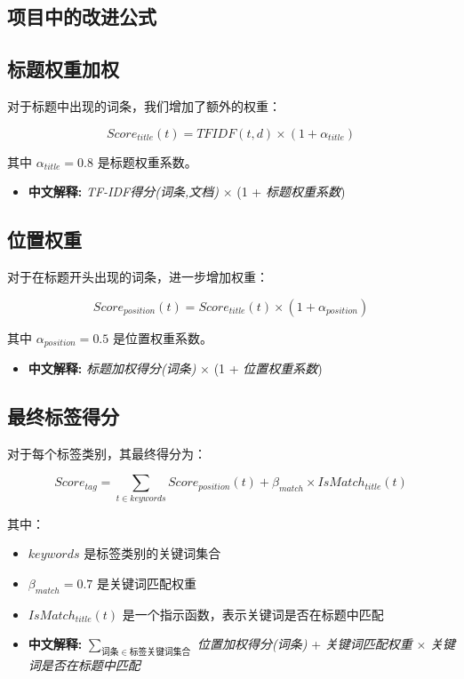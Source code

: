\documentclass{article}
\begin{document}
\begin{CJK}{UTF8}{gbsn}
\section{项目中的改进公式}

\subsection{标题权重加权}
对于标题中出现的词条，我们增加了额外的权重：

\[
Score_{title}(t) = TFIDF(t,d) \times (1 + \alpha_{title})
\]

其中 $\alpha_{title} = 0.8$ 是标题权重系数。
\begin{itemize}
\item \textbf{中文解释:} \emph{TF-IDF得分(词条,文档)} $\times$ (1 + \emph{标题权重系数})
\end{itemize}

\subsection{位置权重}
对于在标题开头出现的词条，进一步增加权重：

\[
Score_{position}(t) = Score_{title}(t) \times (1 + \alpha_{position})
\]

其中 $\alpha_{position} = 0.5$ 是位置权重系数。
\begin{itemize}
\item \textbf{中文解释:} \emph{标题加权得分(词条)} $\times$ (1 + \emph{位置权重系数})
\end{itemize}

\subsection{最终标签得分}
对于每个标签类别，其最终得分为：

\[
Score_{tag} = \sum_{t \in keywords} Score_{position}(t) + \beta_{match} \times IsMatch_{title}(t)
\]

其中：
\begin{itemize}
\item $keywords$ 是标签类别的关键词集合
\item $\beta_{match} = 0.7$ 是关键词匹配权重
\item $IsMatch_{title}(t)$ 是一个指示函数，表示关键词是否在标题中匹配
\item \textbf{中文解释:} $\sum_{词条 \in 标签关键词集合}$ \emph{位置加权得分(词条)} + \emph{关键词匹配权重} $\times$ \emph{关键词是否在标题中匹配}
\end{itemize}


\end{CJK}
\end{document}
